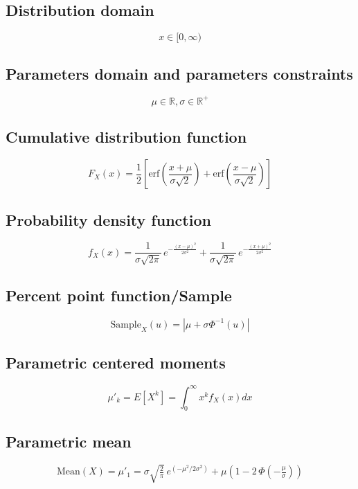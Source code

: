 \documentclass{article}
\begin{document}
\subsection{Distribution domain}
\begin{equation*} x\in [0,\infty)  \end{equation*}
\subsection{Parameters domain and parameters constraints}
\begin{equation*} \mu\in\mathbb{R}, \sigma\in\mathbb{R}^{+} \end{equation*}
\subsection{Cumulative distribution function}
\begin{equation*} F_{X}\left(x\right)=\frac{1}{2}\left[\text{erf}\left(\frac{x+\mu}{\sigma\sqrt{2}}\right)+\text{erf}\left(\frac{x-\mu}{\sigma\sqrt{2}}\right)\right] \end{equation*}
\subsection{Probability density function}
\begin{equation*} f_{X}\left(x\right)=\frac{1}{\sigma\sqrt{2\pi}} \,e^{ -\frac{(x-\mu)^2}{2\sigma^2} }+\frac{1}{\sigma\sqrt{2\pi}} \,e^{ -\frac{(x+\mu)^2}{2\sigma^2} } \end{equation*}
\subsection{Percent point function/Sample}
\begin{equation*} \text{Sample}_{X}\left(u\right)=\left|\mu+\sigma\Phi^{-1}(u)\right| \end{equation*}
\subsection{Parametric centered moments}
\begin{equation*} \mu'_{k}=E[X^k]=\int_{0}^{\infty }x^{k}f_{X}\left(x\right)dx \end{equation*}
\subsection{Parametric mean}
\begin{equation*} \mathrm{Mean}(X)=\mu'_{1}=\sigma \sqrt{\tfrac{2}{\pi}} \,e^{(-\mu^2/2\sigma^2)}+\mu\left(1-2\,\Phi(-\tfrac{\mu}{\sigma})\right) \end{equation*}
\end{document}
